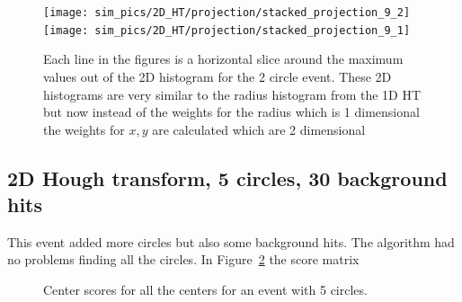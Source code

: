 \documentclass[11pt,twoside]{scrreprt}
\begin{document}
\begin{figure}[htp]
        \centering
        \caption{Center score for the 2D Hough transform for 2 circles with 0 background.}\label{fig:2d_ht_center}

        \texttt{[image: sim\_pics/2D\_HT/projection/stacked\_projection\_9\_2]}%
        \texttt{[image: sim\_pics/2D\_HT/projection/stacked\_projection\_9\_1]}
        \caption[Two slices out of the 2D histogram]{Each line in the figures is a horizontal slice around the maximum values out
        of the 2D histogram for the 2 circle event. These 2D histograms are very similar to the radius histogram from the 1D HT but now instead of the weights for the radius which is 1 dimensional the 
        weights for $x,y$ are calculated which are 2 dimensional}\label{fig:2d_slices}
\end{figure}


\subsection{2D Hough transform, 5 circles, 30 background hits} %
\label{sub:2d_hough_transform_5_circles_30_background_hits}

This event added more circles but also some background hits. The algorithm had no problems finding
all the circles. In Figure~\ref{fig:2d_5_circles_30_bg_radius} the score matrix

\begin{figure}[htbp]
  \centering
  
  
  \caption{Center scores for all the centers for an event with 5 circles.}
  \label{fig:2d_5_circles_30_bg_radius}
\end{figure}
\end{document}
